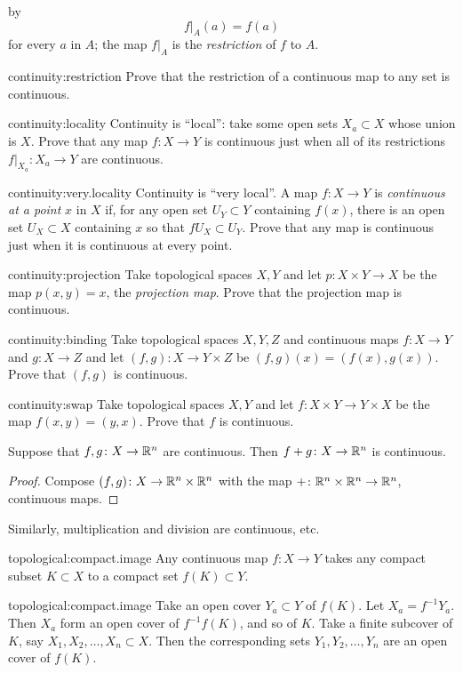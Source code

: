by
\[
\left.f\right|_A(a)=f(a)
\]
for every \(a\) in \(A\); the map \(\left.f\right|_A\) is the \emph{restriction} of \(f\) to \(A\).
\begin{problem}{continuity:restriction}
Prove that the restriction of a continuous map to any set is continuous.
\end{problem}
\begin{problem}{continuity:locality}
Continuity is ``local'': take some open sets \(X_a \subset X\) whose union is \(X\).
Prove that any map \(f \colon X \to Y\) is continuous just when all of its restrictions \(\left.f\right|_{X_a} \colon X_a \to Y\) are continuous.
\end{problem}
\begin{problem}{continuity:very.locality}
Continuity is ``very local''. 
A map \(f \colon X \to Y\) is \emph{continuous at a point} \(x\) in \(X\) if, for any open set \(U_Y \subset Y\) containing \(f(x)\), there is an open set \(U_X \subset X\) containing \(x\) so that \(fU_X \subset U_Y\).
Prove that any map is continuous just when it is continuous at every point.
\end{problem}
\begin{problem}{continuity:projection}
Take topological spaces \(X,Y\) and let \(p \colon X \times Y \to X\) be the map \(p(x,y)=x\), the \emph{projection map}.
Prove that the projection map is continuous.
\end{problem}
\begin{problem}{continuity:binding}
Take topological spaces \(X,Y,Z\) and continuous maps \(f \colon X \to Y\) and \(g \colon X \to Z\) and let \((f,g) \colon X \to Y \times Z\) be \((f,g)(x)=(f(x),g(x))\).
Prove that \((f,g)\) is continuous.
\end{problem}
\begin{problem}{continuity:swap}
Take topological spaces \(X,Y\) and let \(f \colon X \times Y \to Y \times X\) be the map \(f(x,y)=(y,x)\).
Prove that \(f\) is continuous.
\end{problem}
\begin{lemma}
Suppose that \(f, g \colon X \to \mathbb{R}^{n}\) are continuous.
Then \(f+g \colon X \to \mathbb{R}^{n}\) is continuous.
\end{lemma}
\begin{proof}
Compose \((f,g) \colon X \to \mathbb{R}^{n} \times \mathbb{R}^{n}\) with the map \(+ \colon \mathbb{R}^{n} \times \mathbb{R}^{n} \to \mathbb{R}^{n}\), continuous maps.
\end{proof}
Similarly, multiplication and division are continuous, etc.
\begin{problem*}{topological:compact.image}
Any continuous map \(f \colon X \to Y\) takes any compact subset \(K \subset X\) to a compact set \(f(K) \subset Y\).
\end{problem*}
\begin{answer}{topological:compact.image}
Take an open cover \(Y_a \subset Y\) of \(f(K)\).
Let \(X_a=f^{-1} Y_a\).
Then \(X_a\) form an open cover of \(f^{-1}f(K)\), and so of \(K\).
Take a finite subcover of \(K\), say \(X_1, X_2, \dots, X_n \subset X\).
Then the corresponding sets \(Y_1, Y_2, \dots, Y_n\) are an open cover of \(f(K)\).
\end{answer}

